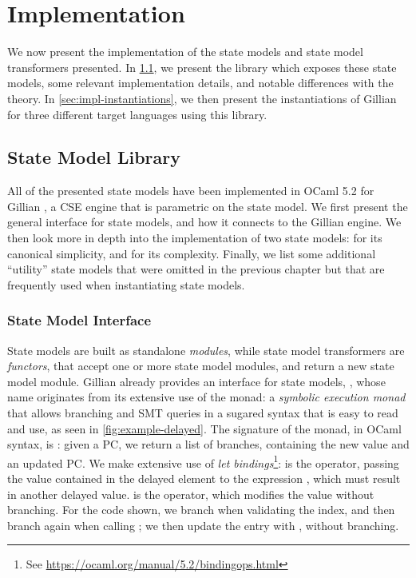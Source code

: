 \chapter{Implementation} \label{chap:implementation}

We now present the implementation of the state models and state model transformers presented. In \cref{sec:state-model-lib}, we present the library which exposes these state models, some relevant implementation details, and notable differences with the theory. In \cref{sec:impl-instantiations}, we then present the instantiations of Gillian for three different target languages using this library.

\section{State Model Library} \label{sec:state-model-lib}

All of the presented state models have been implemented in OCaml 5.2 \cite{ocaml} for Gillian \cite{gillian0,gillian1,gillian2}, a CSE engine that is parametric on the state model. We first present the general interface for state models, and how it connects to the Gillian engine. We then look more in depth into the implementation of two state models: \Ex{} for its canonical simplicity, and \PMap{} for its complexity. Finally, we list some additional ``utility'' state models that were omitted in the previous chapter but that are frequently used when instantiating state models.

\subsection{State Model Interface}

State models are built as standalone \emph{modules}, while state model transformers are \emph{functors}, that accept one or more state model modules, and return a new state model module. Gillian already provides an interface for state models, , whose name originates from its extensive use of the  monad: a \emph{symbolic execution monad} that allows branching and SMT queries in a sugared syntax that is easy to read and use, as seen in \autoref{fig:example-delayed}. The signature of the monad, in OCaml syntax, is : given a PC, we return a list of branches, containing the new value and an updated PC. We make extensive use of \emph{let bindings}\footnote{See \url{https://ocaml.org/manual/5.2/bindingops.html}}:  is the  operator, passing the value  contained in the delayed element  to the expression , which must result in another delayed value.  is the  operator, which modifies the value without branching. For the code shown, we branch when validating the index, and then branch again when calling ; we then update the entry with , without branching.

